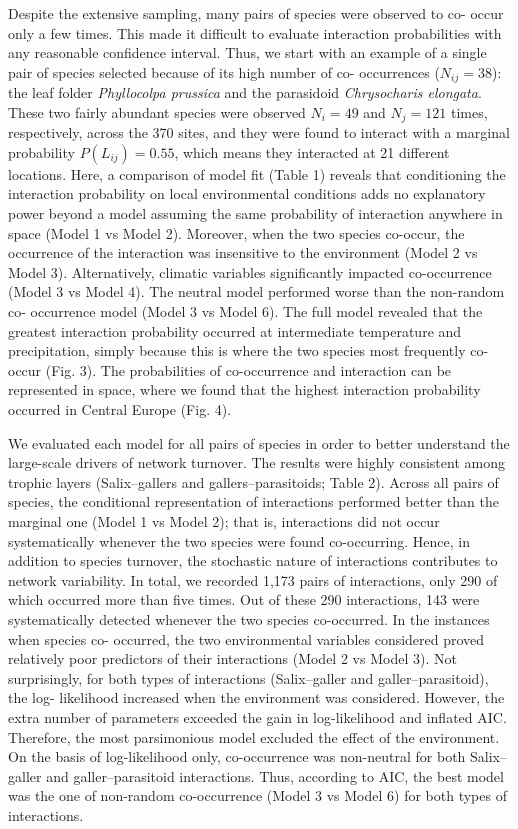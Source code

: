 \documentclass[12pt]{article}
\begin{document}
Despite the extensive sampling, many pairs of species were observed to co-
occur only a few times. This made it difficult to evaluate interaction
probabilities with any reasonable confidence interval. Thus, we start with an
example of a single pair of species selected because of its high number of co-
occurrences ($N_{ij}=38$): the leaf folder \textit{Phyllocolpa prussica} and
the parasidoid \textit{Chrysocharis elongata}. These two fairly abundant
species were observed $N_i=49$ and $N_j=121$ times, respectively, across the
370 sites, and they were found to interact with a marginal probability
$P(L_{ij})=0.55$, which means they interacted at 21 different locations. Here,
a comparison of model fit (Table 1) reveals that conditioning the interaction
probability on local environmental conditions adds no explanatory power beyond
a model assuming the same probability of interaction anywhere in space (Model 1
vs Model 2). Moreover, when the two species co-occur, the occurrence of the
interaction was insensitive to the environment (Model 2 vs Model 3).
Alternatively, climatic variables significantly impacted co-occurrence (Model
3 vs Model 4). The neutral model performed worse than the non-random co-
occurrence model (Model 3 vs Model 6). The full model revealed that the
greatest interaction probability occurred at intermediate temperature and
precipitation, simply because this is where the two species most frequently
co-occur (Fig. 3). The probabilities of co-occurrence and interaction can be
represented in space, where we found that the highest interaction probability
occurred in Central Europe (Fig. 4).

We evaluated each model for all pairs of species in order to better understand
the large-scale drivers of network turnover. The results were highly
consistent among trophic layers (Salix–gallers and gallers–parasitoids; Table
2). Across all pairs of species, the conditional representation of
interactions performed better than the marginal one (Model 1 vs Model 2); that
is, interactions did not occur systematically whenever the two species were
found co-occurring. Hence, in addition to species turnover, the stochastic
nature of interactions contributes to network variability. In total, we
recorded 1,173 pairs of interactions, only 290 of which occurred more than
five times. Out of these 290 interactions, 143 were systematically detected
whenever the two species co-occurred. In the instances when species co-
occurred, the two environmental variables considered proved relatively poor
predictors of their interactions (Model 2 vs Model 3). Not surprisingly, for
both types of interactions (Salix–galler and galler–parasitoid), the log-
likelihood increased when the environment was considered. However, the extra
number of parameters exceeded the gain in log-likelihood and inflated AIC.
Therefore, the most parsimonious model excluded the effect of the environment.
On the basis of log-likelihood only, co-occurrence was non-neutral for both
Salix–galler and galler–parasitoid interactions. Thus, according to AIC, the
best model was the one of non-random co-occurrence (Model 3 vs Model 6) for
both types of interactions.
\end{document}
